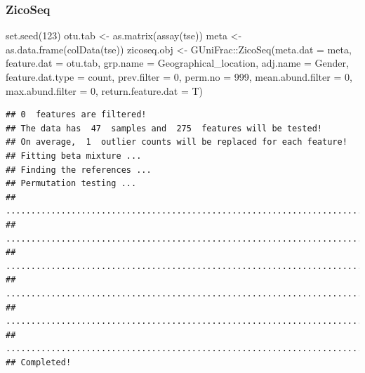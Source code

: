 \documentclass[
]{book}
\newenvironment{Shaded}{\begin{snugshade}}{\end{snugshade}}
\newcommand{\AttributeTok}[1]{\textcolor[rgb]{0.77,0.63,0.00}{#1}}
\newcommand{\DecValTok}[1]{\textcolor[rgb]{0.00,0.00,0.81}{#1}}
\newcommand{\FunctionTok}[1]{\textcolor[rgb]{0.00,0.00,0.00}{#1}}
\newcommand{\NormalTok}[1]{#1}
\newcommand{\OtherTok}[1]{\textcolor[rgb]{0.56,0.35,0.01}{#1}}
\newcommand{\SpecialCharTok}[1]{\textcolor[rgb]{0.00,0.00,0.00}{#1}}
\newcommand{\StringTok}[1]{\textcolor[rgb]{0.31,0.60,0.02}{#1}}
\begin{document}
\hypertarget{zicoseq-1}{%
\subsubsection{ZicoSeq}\label{zicoseq-1}}

\begin{Shaded}
\begin{Highlighting}[]
\FunctionTok{set.seed}\NormalTok{(}\DecValTok{123}\NormalTok{)}
\NormalTok{otu.tab }\OtherTok{\textless{}{-}} \FunctionTok{as.matrix}\NormalTok{(}\FunctionTok{assay}\NormalTok{(tse))}
\NormalTok{meta }\OtherTok{\textless{}{-}} \FunctionTok{as.data.frame}\NormalTok{(}\FunctionTok{colData}\NormalTok{(tse)) }
\NormalTok{zicoseq.obj }\OtherTok{\textless{}{-}}\NormalTok{ GUniFrac}\SpecialCharTok{::}\FunctionTok{ZicoSeq}\NormalTok{(}\AttributeTok{meta.dat =}\NormalTok{ meta, }
                                 \AttributeTok{feature.dat =}\NormalTok{ otu.tab,}
                                 \AttributeTok{grp.name =} \StringTok{\textquotesingle{}Geographical\_location\textquotesingle{}}\NormalTok{,}
                                 \AttributeTok{adj.name =} \StringTok{\textquotesingle{}Gender\textquotesingle{}}\NormalTok{, }
                                 \AttributeTok{feature.dat.type =} \StringTok{\textquotesingle{}count\textquotesingle{}}\NormalTok{,}
                                 \AttributeTok{prev.filter =} \DecValTok{0}\NormalTok{,}
                                 \AttributeTok{perm.no =} \DecValTok{999}\NormalTok{,}
                                 \AttributeTok{mean.abund.filter =} \DecValTok{0}\NormalTok{,}
                                 \AttributeTok{max.abund.filter =} \DecValTok{0}\NormalTok{,}
                                 \AttributeTok{return.feature.dat =}\NormalTok{ T)}
\end{Highlighting}
\end{Shaded}

\begin{verbatim}
## 0  features are filtered!
## The data has  47  samples and  275  features will be tested!
## On average,  1  outlier counts will be replaced for each feature!
## Fitting beta mixture ...
## Finding the references ...
## Permutation testing ...
## ...................................................................................................
## ...................................................................................................
## ...................................................................................................
## ...................................................................................................
## ...................................................................................................
## ...................................................................................................
## Completed!
\end{verbatim}
\end{document}
